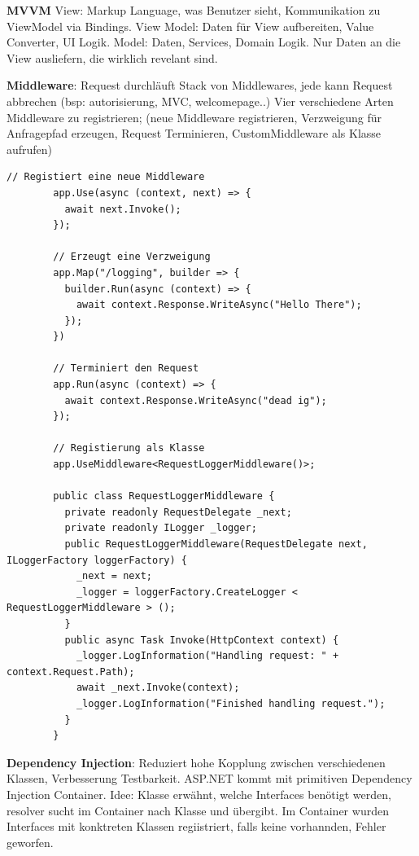\documentclass[10pt,landscape]{article}
\begin{document}
\begin{multicols}{2}
        \textbf{MVVM} View: Markup Language, was Benutzer sieht, Kommunikation zu ViewModel via Bindings.
        View Model: Daten für View aufbereiten, Value Converter, UI Logik. Model: Daten, Services, Domain Logik.
        Nur Daten an die View ausliefern, die wirklich revelant sind.

        \textbf{Middleware}: Request durchläuft Stack von Middlewares, jede kann Request abbrechen (bsp: autorisierung, MVC, welcomepage..)
        Vier verschiedene Arten Middleware zu registrieren; (neue Middleware registrieren, Verzweigung für Anfragepfad erzeugen, Request Terminieren, CustomMiddleware als Klasse aufrufen)

        \begin{lstlisting}[style=CSharp]
        // Registiert eine neue Middleware
        app.Use(async (context, next) => {
          await next.Invoke();
        });

        // Erzeugt eine Verzweigung
        app.Map("/logging", builder => {
          builder.Run(async (context) => {
            await context.Response.WriteAsync("Hello There");
          });
        })

        // Terminiert den Request
        app.Run(async (context) => {
          await context.Response.WriteAsync("dead ig");
        });

        // Registierung als Klasse
        app.UseMiddleware<RequestLoggerMiddleware()>;

        public class RequestLoggerMiddleware {
          private readonly RequestDelegate _next;
          private readonly ILogger _logger;
          public RequestLoggerMiddleware(RequestDelegate next, ILoggerFactory loggerFactory) {
            _next = next;
            _logger = loggerFactory.CreateLogger < RequestLoggerMiddleware > ();
          }
          public async Task Invoke(HttpContext context) {
            _logger.LogInformation("Handling request: " + context.Request.Path);
            await _next.Invoke(context);
            _logger.LogInformation("Finished handling request.");
          }
        }
        \end{lstlisting}

        \textbf{Dependency Injection}: Reduziert hohe Kopplung zwischen verschiedenen Klassen, Verbesserung Testbarkeit. ASP.NET kommt mit primitiven Dependency Injection Container.
        Idee: Klasse erwähnt, welche Interfaces benötigt werden, resolver sucht im Container nach Klasse und übergibt. Im Container wurden Interfaces mit konktreten Klassen regiistriert, falls keine vorhannden, Fehler geworfen.


\end{multicols}
\end{document}
